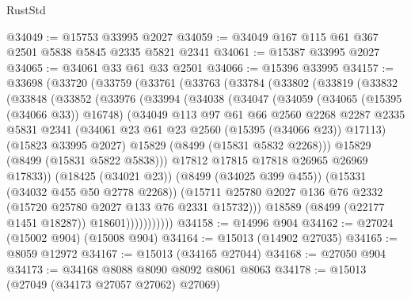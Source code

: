 \begin{lexlean}{RustStd}
\begin{coremodule}
@34049 := @15753 @33995 @2027
@34059 := @34049 @167 @115 @61 @367 @2501 @5838 @5845 @2335 @5821 @2341
@34061 := @15387 @33995 @2027
@34065 := @34061 @33 @61 @33 @2501
@34066 := @15396 @33995
@34157 := @33698
    (@33720
      (@33759
        (@33761
          (@33763
            (@33784
              (@33802
                (@33819
                  (@33832
                    (@33848
                      (@33852
                        (@33976
                          (@33994
                            (@34038
                              (@34047
                                (@34059
                                  (@34065 (@15395 (@34066 @33)) @16748)
                                  (@34049
                                    @113
                                    @97
                                    @61
                                    @66
                                    @2560
                                    @2268
                                    @2287
                                    @2335
                                    @5831
                                    @2341
                                    (@34061 @23 @61 @23 @2560 (@15395 (@34066 @23)) @17113)
                                    (@15823 @33995 @2027)
                                    @15829
                                    (@8499 (@15831 @5832 @2268)))
                                  @15829
                                  (@8499 (@15831 @5822 @5838)))
                                @17812
                                @17815
                                @17818
                                @26965
                                @26969
                                @17833))
                            (@18425 (@34021 @23))
                            (@8499 (@34025 @399 @455))
                            (@15331 (@34032 @455 @50 @2778 @2268))
                            (@15711
                              @25780
                              @2027
                              @136
                              @76
                              @2332
                              (@15720 @25780 @2027 @133 @76 @2331 @15732)))
                          @18589
                          (@8499 (@22177 @1451 @18287))
                          @18601)))))))))))
@34158 := @14996 @904
@34162 := @27024 (@15002 @904) (@15008 @904)
@34164 := @15013 (@14902 @27035)
@34165 := @8059 @12972
@34167 := @15013 (@34165 @27044)
@34168 := @27050 @904
@34173 := @34168 @8088 @8090 @8092 @8061 @8063
@34178 := @15013 (@27049 (@34173 @27057 @27062) @27069)

\end{coremodule}
\end{lexlean}
